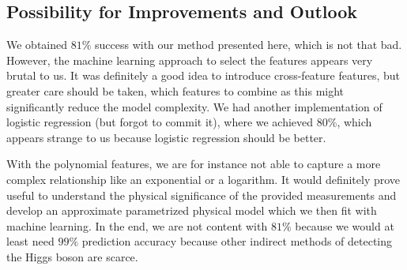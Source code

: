 \documentclass[10pt,conference,compsocconf]{IEEEtran}
\begin{document}
\subsection{Possibility for Improvements and Outlook}
We obtained $81\%$ success with our method presented here, which is not that bad.
However, the machine learning approach to select the features appears very brutal to us. It was definitely a good idea to introduce cross-feature features, but greater care should be taken, which features to combine as this might significantly reduce the model complexity. We had another implementation of logistic regression (but forgot to commit it), where we achieved 80\%, which appears strange to us because logistic regression should be better.

With the polynomial features, we are for instance not able to capture a more complex relationship like an exponential or a logarithm. It would definitely prove useful to understand the physical significance of the provided measurements and develop an approximate parametrized physical model which we then fit with machine learning. In the end, we are not content with $81\%$ because we would at least need $99\%$ prediction accuracy because other indirect methods of detecting the Higgs boson are scarce.




%
%
\end{document}
